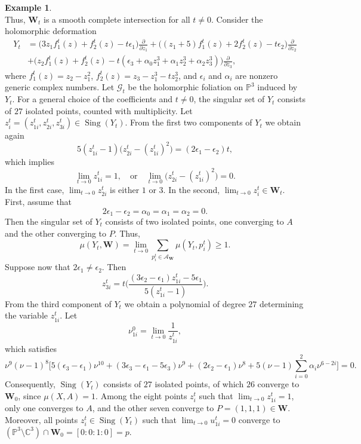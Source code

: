\documentclass[10pt,twoside]{amsart}
\numberwithin{equation}{section}
\theoremstyle{definition}
\newtheorem{example}[proposition]{Example}
\theoremstyle{remark}
\DeclareMathOperator{\sing}{Sing}
\newcommand{\C}{\mathbb{C}}
\newcommand{\G}{\mathcal{G}}
\newcommand{\W}{\mathbf{W}}
\begin{document}
\begin{example}
\[\]
Thus, $\W_t$ is a smooth complete intersection for all $t\ne 0$.
Consider the holomorphic deformation
\begin{equation*}
\begin{array}{ll}
Y_t&=\bigl(3z_1f_1^t(z)+f_2^t(z)-t\epsilon_1\bigr)\frac{\partial}{\partial z_1}
+\bigl((z_1+5)f_1^t(z)+2f_2^t(z)-t\epsilon_2\bigr)\frac{\partial}{\partial z_2}\\
&+\bigl(z_2f_1^t(z)+f_2^t(z)-t(\epsilon_3+\alpha_0 z_1^3+\alpha_1 z_2^3+\alpha_2 z_3^3)\bigr)\frac{\partial}{\partial z_3},
\end{array}
\end{equation*}
where $f_1^t(z)=z_2-z_1^2$, $f_2^t(z)=z_3-z_1^3-tz_2^3$, and $\epsilon_i$ and $\alpha_i$ are nonzero generic complex numbers.
Let $\G_t$ be the holomorphic foliation on $\mathbb{P}^3$ induced by $Y_t$.
For a general choice of the coefficients and $t\neq0$, the singular set of $Y_t$ consists of $27$ isolated points, counted with multiplicity.
Let $z_i^t=(z_{1i}^t,z_{2i}^t,z_{3i}^t)\in\sing(Y_t)$. From the first two components of $Y_t$ we obtain again
\[
5(z_{1i}^t-1)\bigl(z_{2i}^t-(z_{1i}^t)^2\bigr)=(2\epsilon_1-\epsilon_2)t,
\]
which implies
\[
\lim_{t\to0}z_{1i}^t=1,
\quad\text{or}\quad
\lim_{t\to0}\bigl(z_{2i}^t-(z_{1i}^t)^2\bigr)=0.
\]
In the first case, $\lim_{t\to0}z_{2i}^t$ is either $1$ or $3$. In the second, $\lim_{t\to0}z_i^t\in\W_t$.
First, assume that \[2\epsilon_1-\epsilon_2=\alpha_0=\alpha_1=\alpha_2=0.\]
Then the singular set of $Y_t$ consists of two isolated points, one converging to $A$ and the other converging to $P$.
Thus,
\[
\mu(Y_t,\W)=\lim_{t\to0}\sum_{p_i^t\in\mathcal{A}_{\W}}\mu(Y_t,p_i^t)\geq 1.
\]
Suppose now that $2\epsilon_1\neq\epsilon_2$. Then
\[
z_{3i}^t=t\bigg(\frac{(3\epsilon_2-\epsilon_1)z_{1i}^t-5\epsilon_1}{5(z_{1i}^t-1)}\bigg).
\]
From the third component of $Y_t$ we obtain a polynomial of degree $27$ determining the variable $z_{1i}^t$.
Let
\[
\nu_{1i}^0=\lim_{t\to0}\frac{1}{z_{1i}^t},
\]
which satisfies
\[
\nu^9(\nu-1)^8\bigg[5(\epsilon_3-\epsilon_1)\nu^{10}
+(3\epsilon_3-\epsilon_1-5\epsilon_3)\nu^9
+(2\epsilon_2-\epsilon_1)\nu^8
+5(\nu-1)\sum_{i=0}^{2}\alpha_{i}\nu^{6-2i}\bigg]=0.
\]
Consequently, $\sing(Y_t)$ consists of $27$ isolated points, of which $26$ converge to $\W_0$, since $\mu(X,A)=1$.
Among the eight points $z_i^t$ such that $\lim_{t\to0}z_{1i}^t=1$, only one converges to $A$, and the other seven converge to $P=(1,1,1)\in\W$.
Moreover, all points $z_i^t\in\sing(Y_t)$ such that $\lim_{t\to0}u_{1i}^t=0$ converge to
$(\mathbb{P}^3\setminus\C^3)\cap \W_0=[0:0:1:0]=p$.

\end{example}
\end{document}
